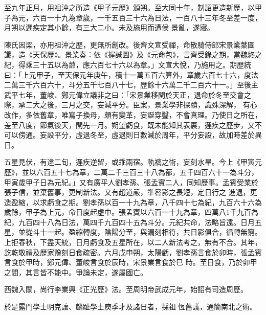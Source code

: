 \begin{pinyinscope}
 至九年正月，用祖沖之所造《甲子元歷》頒朔。至大同十年，制詔更造新歷，以甲子為元，六百一十九為章歲，一千五百三十六為日法，一百八十三年冬至差一度，月朔以遲疾定其小餘，有三大二小。未及施用而遭侯
 景亂，遂寢。



 陳氏因梁，亦用祖沖之歷，更無所創改。後齊文宣受禪，命散騎侍郎宋景業葉圖讖，造《天保歷》。景業奏：依《握誠圖》及《元命包》，言齊受錄之期，當魏終之紀，得乘三十五以為蔀，應六百七十六以為章。」文宣大悅，乃施用之。期歷統曰：「上元甲子，至天保元年庚午，積十一萬五百六算外，章歲六百七十六，度法二萬三千六百六十，斗分五千七百八十七，歷餘十六萬二千二百六十一。」至後主武平七年，董峻、鄭元偉立議非之曰：「宋景業移閏於天正，退命於冬至交會之際，承二大之後，三月之交，妄減平分。臣案，景業學非探賾，識殊深解，
 有心改作，多依舊章，唯寫子換母，頗有變革，妄誕穿鑿，不會真理。乃使日之所在，差至八度，節氣後天，閏先一月。朔望虧食，既未能知其表裏，遲疾之歷步，又不可以傍通。妄設平分，虛退冬至，虛退則日數減於周年，平分妄設，故加時差於異日。



 五星見伏，有違二旬，遲疾逆留，或乖兩宿。軌褵之術，妄刻水旱。今上《甲寅元歷》，並以六百五十七為章，二萬二千三百三十八為蔀，五千四百六十一為斗分，甲寅歲甲子日為元紀。」又有廣平人劉孝孫、張孟賓二人，同知歷事。孟賓受業於張子信，並棄舊事，更制新法。又有趙道嚴，準晷影之長短，定日行之
 進退，更造盈縮，以求虧食之期。劉孝孫以百一十九為章，八千四十七為紀，九百六十六為歲餘，甲子為上元，命日度起虛中。張孟賓以六百一十九為章，四萬八1千九百為紀，九百四十八為日法，萬四千九百四十五為斗分。元紀共命，法略旨遠。日月五星，並從斗十一起。盈縮轉度，陰陽分至，與漏刻相符，共日影俱合，循轉無窮。上拒春秋，下盡天統，日月虧食及五星所在，以二人新法考之，無有不合。其年，訖乾敬禮及歷家豫刻日食疏密。六月戊申朔，太陽虧，劉孝孫言食於卯時，張孟賓言食於甲時，鄭元偉、董峻言食於辰時，宋景業言食於巳
 時。至日食，乃於卯甲之間，其言皆不能中。爭論未定，遂屬國亡。



 西魏入關，尚行李業興《正光歷》法。至周明帝武成元年，始詔有司造周歷。



 於是露門學士明克讓、麟趾學士庾季才及諸日者，採祖恆舊議，通簡南北之術。




\end{pinyinscope}
